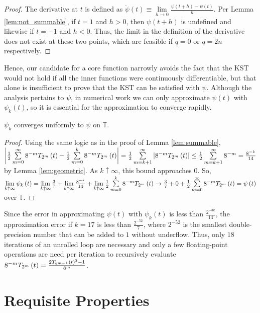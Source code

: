 \begin{proof}
  The derivative at $t$ is defined as $\dot{\psi}\left(t\right) \equiv \lim\limits_{h \rightarrow 0} \frac{\psi\left(t + h\right) - \psi\left(t\right)}{h}$. Per Lemma \ref{lem:not_summable}, if $t = 1$ and $h > 0$, then $\psi\left(t + h\right)$ is undefined and likewise if $t = -1$ and $h < 0$. Thus, the limit in the definition of the derivative does not exist at these two points, which are feasible if $q = 0$ or $q = 2n$ respectively.
\end{proof}
\noindent Hence, our candidate for a core function narrowly avoids the fact that the KST would not hold if all the inner functions were continuously differentiable, but that alone is insufficient to prove that the KST can be satisfied with $\psi$. Although the analysis pertains to $\psi$, in numerical work we can only approximate $\psi\left(t\right)$ with $\psi_k\left(t\right)$, so it is essential for the approximation to converge rapidly.

\begin{lemma}[]
  \label{lem:limit}
  \lean{}
  \leanok
  $\psi_k$ converges uniformly to $\psi$ on $\mathbb{T}$.
\end{lemma}
  
\begin{proof}
  \uses{}
  \leanok
  Using the same logic as in the proof of Lemma \ref{lem:summable}, $\left|\frac{1}{2} \sum\limits_{m = 0}^{\infty} 8^{-m} T_{2^{m}}\left(t\right) - \frac{1}{2} \sum\limits_{m = 0}^{k} 8^{-m} T_{2^{m}}\left(t\right)\right| = \frac{1}{2} \sum\limits_{m = k + 1}^\infty \left|8^{-m}T_{2^{m}}\left(t\right)\right| \leq \frac{1}{2} \sum\limits_{m = k + 1}^\infty 8^{-m} = \frac{8^{-k}}{14}$ by Lemma \ref{lem:geometric}. As $k \uparrow \infty$, this bound approaches $0$. So, $\lim\limits_{k \uparrow \infty}\psi_k\left(t\right) = \lim\limits_{k \uparrow \infty} \frac{3}{7} + \lim\limits_{k \uparrow \infty} \frac{8^{-k}}{14} + \lim\limits_{k \uparrow \infty} \frac{1}{2} \sum\limits_{m = 0}^{k} 8^{-m} T_{2^{m}}\left(t\right) \rightarrow \frac{3}{7} + 0 + \frac{1}{2} \sum\limits_{m = 0}^{\infty} 8^{-m} T_{2^{m}}\left(t\right) = \psi\left(t\right)$ over $\mathbb{T}$.
\end{proof}
\noindent Since the error in approximating $\psi\left(t\right)$ with $\psi_k\left(t\right)$ is less than $\frac{2^{-3k}}{14}$, the approximation error if $k = 17$ is less than $\frac{2^{-52}}{7}$, where $2^{-52}$ is the smallest double-precision number that can be added to $1$ without underflow. Thus, only $18$ iterations of an unrolled loop are necessary and only a few floating-point operations are need per iteration to recursively evaluate $8^{-m} T_{2^{m}}\left(t\right) = \frac{2T_{2^{m - 1}}\left(t\right)^2 - 1}{8^m}$.

\section{Requisite Properties}\label{sec:RequisiteProperties}

